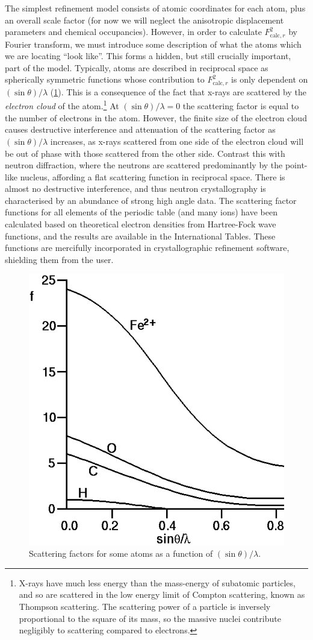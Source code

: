 \begin{refsection}
The simplest refinement model consists of atomic coordinates for each atom, plus an overall scale factor (for now we will neglect the anisotropic displacement parameters and chemical occupancies).
However, in order to calculate $ F^2_{\mathrm{calc}, r} $ by Fourier transform, we must introduce some description of what the atoms which we are locating ``look like''.
This forms a hidden, but still crucially important, part of the model.
Typically, atoms are described in reciprocal space as spherically symmetric functions whose contribution to $ F^2_{\mathrm{calc}, r} $ is only dependent on $ (\sin\theta)/\lambda $ (\cref{fig:scatterf}).
This is a consequence of the fact that x-rays are scattered by the \emph{electron cloud} of the atom.\footnote{X-rays have much less energy than the mass-energy of subatomic particles, and so are scattered in the low energy limit of Compton scattering, known as Thompson scattering.
The scattering power of a particle is inversely proportional to the square of its mass, so the massive nuclei contribute negligibly to scattering compared to electrons.}
At $ (\sin\theta)/\lambda = 0 $ the scattering factor is equal to the number of electrons in the atom.
However, the finite size of the electron cloud causes destructive interference and attenuation of the scattering factor as $ (\sin\theta)/\lambda $ increases, as x-rays scattered from one side of the electron cloud will be out of phase with those scattered from the other side.
Contrast this with neutron diffraction, where the neutrons are scattered predominantly by the point-like nucleus, affording a flat scattering function in reciprocal space.
There is almost no destructive interference, and thus neutron crystallography is characterised by an abundance of strong high angle data.
The scattering factor functions for all elements of the periodic table (and many ions) have been calculated based on theoretical electron densities from Hartree-Fock wave functions, and the results are available in the International Tables.\autocite{IntTabCIntensityofdiffractedintensities}
These functions are mercifully incorporated in crystallographic refinement software, shielding them from the user.

\begin{figure}
    \centering
    \includegraphics[width=0.5\linewidth]{Figures/scatterf.png}
    \caption{Scattering factors for some atoms as a function of $ (\sin\theta)/\lambda $.}\label{fig:scatterf}
\end{figure}


\end{refsection}

